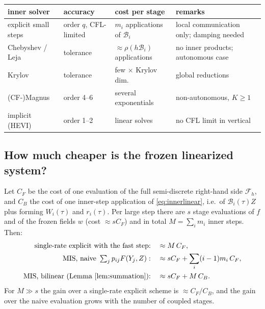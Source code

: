 \documentclass[11pt,a4paper]{article}
\theoremstyle{definition}
\theoremstyle{remark}
\begin{document}
\begin{center}
\begin{tabular}{p{3.2cm}p{3.3cm}p{3.6cm}p{3.6cm}}
\toprule
inner solver & accuracy & cost per stage & remarks\\\midrule
explicit small steps & order $q$, CFL-limited & $m_i$ applications of $\mathcal B_i$ & local communication only; damping needed\\
Chebyshev / Leja & tolerance & $\approx\rho(h\mathcal B_i)$ applications & no inner products; autonomous case\\
Krylov & tolerance & few $\times$ Krylov dim. & global reductions\\
(CF-)Magnus & order 4--6 & several exponentials & non-autonomous, $K\ge1$\\
implicit (HEVI) & order 1--2 & linear solves & no CFL limit in vertical\\
\bottomrule
\end{tabular}
\end{center}

\subsection{How much cheaper is the frozen linearized system?}
\label{sec:cost}

Let $C_F$ be the cost of one evaluation of the full semi-discrete
right-hand side $\mathcal F_h$, and $C_B$ the cost of one inner-step
application of \eqref{eq:innerlinear}, i.e.\ of $\mathcal B_i(\tau)Z$
plus forming $W_i(\tau)$ and $r_i(\tau)$. Per large step there are $s$
stage evaluations of $f$ and of the frozen fields $w$ (cost $\approx sC_F$)
and in total $M=\sum_im_i$ inner steps. Then:
\begin{align*}
 \text{single-rate explicit with the fast step:} &\quad \approx M\,C_F,\\
 \text{MIS, naive } \textstyle\sum_jp_{ij}F(Y_j,Z): &\quad \approx sC_F+\sum_i(i-1)m_i\,C_F,\\
 \text{MIS, bilinear (Lemma~\ref{lem:summation}):} &\quad \approx sC_F+M\,C_B .
\end{align*}
For $M\gg s$ the gain over a single-rate explicit scheme is
$\approx C_F/C_B$, and the gain over the naive evaluation grows with
the number of coupled stages.
\end{document}
